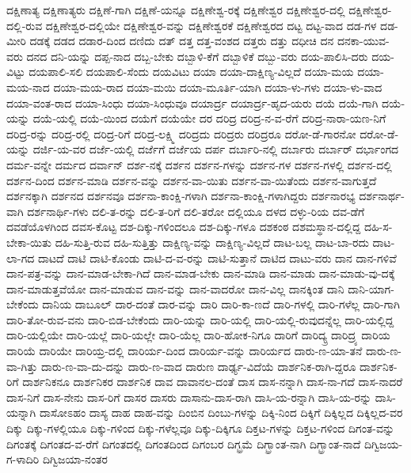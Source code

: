 {ದಕ್ಷಿಣಾತ್ಯ
ದಕ್ಷಿಣಾತ್ಯರು
ದಕ್ಷಿಣೆ-ಗಾಗಿ
ದಕ್ಷಿಣೆ-ಯನ್ನೂ
ದಕ್ಷಿಣೇಶ್ವ-ರಕ್ಕೆ
ದಕ್ಷಿಣೇಶ್ವರ
ದಕ್ಷಿಣೇಶ್ವರ-ದಲ್ಲಿ
ದಕ್ಷಿಣೇಶ್ವರ-ದಲ್ಲಿ-ರುವ
ದಕ್ಷಿಣೇಶ್ವರ-ದಲ್ಲಿಯೇ
ದಕ್ಷಿಣೇಶ್ವರ-ವನ್ನು
ದಕ್ಷಿಣೇಶ್ವರಕೆ
ದಕ್ಷಿಣೇಶ್ವರದ
ದಟ್ಟ
ದಟ್ಟ-ವಾದ
ದಡ-ಗಳ
ದಡ-ಮೀರಿ
ದಡಕ್ಕೆ
ದಡದ
ದಡಾರ-ದಿಂದ
ದಣಿದು
ದತ್
ದತ್ತ
ದತ್ತ-ವಂಶದ
ದತ್ತರು
ದತ್ತು
ದಧೀಚಿ
ದನ
ದನಕಾ-ಯುವ-ವರು
ದನದ
ದನಿ-ಯನ್ನು
ದಪ್ಪ-ನಾದ
ದಬ್ಬ-ಬೇಕು
ದಬ್ಬಾಳಿ-ಕೆಗೆ
ದಬ್ಬಾಳಿಕೆ
ದಬ್ಬು-ವರು
ದಯ-ಪಾಲಿಸಿ-ದರು
ದಯ-ವಿಟ್ಟು
ದಯಪಾಲಿ-ಸಲಿ
ದಯಪಾಲಿ-ಸೆಂದು
ದಯವಿಟು
ದಯಾ
ದಯಾ-ದಾಕ್ಷಿಣ್ಯ-ವಿಲ್ಲದೆ
ದಯಾ-ಮಯ
ದಯಾ-ಮಯ-ನಾದ
ದಯಾ-ಮಯ-ರಾದ
ದಯಾ-ಮಯಿ
ದಯಾ-ಮೂರ್ತಿ-ಯಾಗಿ
ದಯಾ-ಳು-ಗಳು
ದಯಾ-ಳು-ವಾದ
ದಯಾ-ವಂತ-ರಾದ
ದಯಾ-ಸಿಂಧು
ದಯಾ-ಸಿಂಧುವೂ
ದಯಾರ್ದ್ರ
ದಯಾರ್ದ್ರ-ಹೃದ-ಯರು
ದಯೆ
ದಯೆ-ಗಾಗಿ
ದಯೆ-ಯನ್ನು
ದಯೆ-ಯಲ್ಲಿ
ದಯೆ-ಯಿಂದ
ದಯೆಗೆ
ದಯೆಯೇ
ದರ
ದರಿದ್ರ
ದರಿದ್ರ-ನ-ವ-ರೆಗೆ
ದರಿದ್ರ-ನಾರಾ-ಯಣ-ನಿಗೆ
ದರಿದ್ರ-ರನ್ನು
ದರಿದ್ರ-ರಲ್ಲಿ
ದರಿದ್ರ-ರಿಗೆ
ದರಿದ್ರ-ಲಕ್ಷ್ಮಿ
ದರಿದ್ರದು
ದರಿದ್ರರು
ದರಿದ್ರರೂ
ದರೋ-ಡೆ-ಗಾರನೋ
ದರೋ-ಡೆ-ಯನ್ನು
ದರ್ಜಿ-ಯ-ವರ
ದರ್ಜೆ-ಯಲ್ಲಿ
ದರ್ಜೆಗೆ
ದರ್ಜೆಯ
ದರ್ಪ
ದರ್ಬಾರಿ-ನಲ್ಲಿ
ದರ್ಬಾರು
ದರ್ಬಾರ್
ದರ್ಭಾಂಗದ
ದರ್ಮ-ವನ್ನೇ
ದರ್ಮದ
ದರ್ವಾನ್
ದರ್ಶ-ನಕ್ಕೆ
ದರ್ಶನ
ದರ್ಶನ-ಗಳನ್ನು
ದರ್ಶನ-ಗಳ
ದರ್ಶನ-ಗಳಲ್ಲಿ
ದರ್ಶನ-ದಲ್ಲಿ
ದರ್ಶನ-ದಿಂದ
ದರ್ಶನ-ಮಾಡಿ
ದರ್ಶನ-ವನ್ನು
ದರ್ಶನ-ವಾ-ಯಿತು
ದರ್ಶನ-ವಾ-ಯಿತೆಂದು
ದರ್ಶನ-ವಾಗುತ್ತದೆ
ದರ್ಶನಕ್ಕಾಗಿ
ದರ್ಶನದ
ದರ್ಶನವೂ
ದರ್ಶನಾ-ಕಾಂಕ್ಷಿ-ಗಳಾಗಿ
ದರ್ಶನಾ-ಕಾಂಕ್ಷಿ-ಗಳಾಗಿದ್ದರು
ದರ್ಶನಾರಭ್ಯ
ದರ್ಶನಾರ್ಥ-ವಾಗಿ
ದರ್ಶನಾರ್ಥಿ-ಗಳು
ದಲಿ-ತ-ರನ್ನು
ದಲಿ-ತ-ರಿಗೆ
ದಲಿ-ತರೋ
ದಲ್ಲಿಯೂ
ದಳದ
ದಳ್ಳು-ರಿಯ
ದವ-ಡೆಗೆ
ದವಡೆಯೊಳಗಿಂದ
ದವಸ-ಕೊಟ್ಟ
ದಶ-ದಿಕ್ಕು-ಗಳಿಂದಲೂ
ದಶ-ದಿಕ್ಕು-ಗಳೂ
ದಶಕಂಠ
ದಶಮಸ್ಥಾನ-ದಲ್ಲಿದ್ದ
ದಹಿ-ಸ-ಬೇಕಾ-ಯಿತು
ದಹಿ-ಸುತ್ತಿ-ರುವ
ದಹಿ-ಸುತ್ತಿತ್ತು
ದಾಕ್ಷಿಣ್ಯ-ವನ್ನು
ದಾಕ್ಷಿಣ್ಯ-ವಿಲ್ಲದೆ
ದಾಟ-ಬಲ್ಲ
ದಾಟ-ಬಾ-ರದು
ದಾಟ-ಲಾ-ಗದ
ದಾಟದೆ
ದಾಟಿ
ದಾಟಿ-ಕೊಂಡು
ದಾಟಿ-ದ-ವ-ರನ್ನು
ದಾಟಿ-ಸುತ್ತಾನೆ
ದಾಟಿದ
ದಾಟು-ವರು
ದಾನ
ದಾನ-ಗಳಿವೆ
ದಾನ-ಪತ್ರ-ವನ್ನು
ದಾನ-ಮಾಡ-ಬೇಕಾ-ಗಿದೆ
ದಾನ-ಮಾಡ-ಬೇಕು
ದಾನ-ಮಾಡಿ
ದಾನ-ಮಾಡು
ದಾನ-ಮಾಡು-ವು-ದಕ್ಕೆ
ದಾನ-ಮಾಡುತ್ತವೆಯೋ
ದಾನ-ಮಾಡುವ
ದಾನ-ವನ್ನು
ದಾನ-ವಾದರೋ
ದಾನ-ವಿಲ್ಲ
ದಾನಕ್ಕಿಂತ
ದಾನಿ
ದಾನಿ-ಯಾಗ-ಬೇಕೆಂದು
ದಾನಿಯ
ದಾಬೂಲ್
ದಾರ-ದಂತೆ
ದಾರ-ವನ್ನು
ದಾರಿ
ದಾರಿ-ಕಾ-ಣದೆ
ದಾರಿ-ಗಳಲ್ಲಿ
ದಾರಿ-ಗಳೆಲ್ಲ
ದಾರಿ-ಗಾಗಿ
ದಾರಿ-ತೋ-ರುವ-ವನು
ದಾರಿ-ಬಿಡ-ಬೇಕೆಂದು
ದಾರಿ-ಯನ್ನು
ದಾರಿ-ಯಲ್ಲಿ
ದಾರಿ-ಯಲ್ಲಿ-ರುವುದನ್ನೆಲ್ಲ
ದಾರಿ-ಯಲ್ಲಿದ್ದ
ದಾರಿ-ಯಲ್ಲಿಯೇ
ದಾರಿ-ಯಲ್ಲೆ
ದಾರಿ-ಯಲ್ಲೇ
ದಾರಿ-ಯೆಲ್ಲ
ದಾರಿ-ಹೋಕ-ನಿಗೂ
ದಾರಿಗೆ
ದಾರಿದ್ಯ್ರ
ದಾರಿದ್ರ್ಯ
ದಾರಿಯ
ದಾರಿಯೆ
ದಾರಿಯೇ
ದಾರಿಯ್ರ-ದಲ್ಲಿ
ದಾರಿರ್ಯ-ದಿಂದ
ದಾರಿರ್ಯ-ವನ್ನು
ದಾರಿರ್ಯದ
ದಾರು-ಣ-ಯಾ-ತನೆ
ದಾರು-ಣ-ವಾ-ಗಿತ್ತು
ದಾರು-ಣ-ವಾ-ದು-ದನ್ನು
ದಾರು-ಣ-ವಾದ
ದಾರುಣ
ದಾರ್ಢ್ಯ-ವಿದೆಯೆ
ದಾರ್ಶನಿಕ-ರಾಗಿ-ದ್ದರೂ
ದಾರ್ಶನಿಕ-ರಿಗೆ
ದಾರ್ಶನಿಕನೂ
ದಾರ್ಶನಿಕರ
ದಾರ್ಶನಿಕ
ದಾವ
ದಾವಾನಲ-ದಂತೆ
ದಾಸ
ದಾಸ-ನನ್ನಾಗಿ
ದಾಸ-ನಾ-ಗದೆ
ದಾಸ-ನಾದರೆ
ದಾಸ-ನಿಗೆ
ದಾಸ-ನೇನು
ದಾಸ-ರಿಗೆ
ದಾಸರ
ದಾಸರು
ದಾಸಾನು-ದಾಸ-ರಾಗಿ
ದಾಸಿ-ಯ-ರನ್ನಾಗಿ
ದಾಸಿ-ಯ-ರನ್ನು
ದಾಸಿ-ಯನ್ನಾಗಿ
ದಾಸೋಽಹಂ
ದಾಸ್ಯ
ದಾಹ
ದಾಹ-ವನ್ನು
ದಿಂಬಿನ
ದಿಂಬು-ಗಳನ್ನು
ದಿಕ್ಕಿ-ನಿಂದ
ದಿಕ್ಕಿಗೆ
ದಿಕ್ಕಿಲ್ಲದ
ದಿಕ್ಕಿಲ್ಲದ-ವರ
ದಿಕ್ಕು
ದಿಕ್ಕು-ಗಳಲ್ಲಿಯೂ
ದಿಕ್ಕು-ಗಳಿಂದ
ದಿಕ್ಕು-ಗಳೆಲ್ಲವೂ
ದಿಕ್ಕು-ದಿಕ್ಕಿಗೂ
ದಿಕ್ತಟ-ಗಳನ್ನು
ದಿಕ್ತಟ-ಗಳಿಂದ
ದಿಗಂತ-ವನ್ನು
ದಿಗಂತಕ್ಕೆ
ದಿಗಂತದ-ವ-ರೆಗೆ
ದಿಗಂತದಲ್ಲಿ
ದಿಗಂತದಿಂದ
ದಿಗಂಬರ
ದಿಗ್ಭ್ರಮೆ
ದಿಗ್ಭ್ರಾಂತ-ನಾಗಿ
ದಿಗ್ಭ್ರಾಂತ-ನಾದೆ
ದಿಗ್ವಿಜಯ-ಗ-ಳಾದಿರಿ
ದಿಗ್ವಿಜಯಾ-ನಂತರ
}
